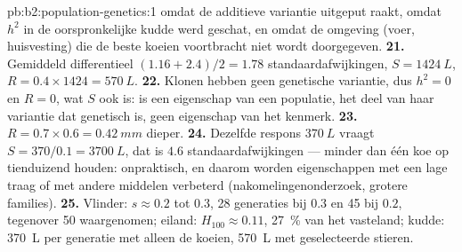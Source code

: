 \begin{solution}{pb:b2:population-genetics:1}
omdat de additieve variantie uitgeput raakt, omdat $h^{2}$
in de oorspronkelijke kudde werd geschat, en omdat de omgeving
(voer, huisvesting) die de beste koeien voortbracht niet wordt doorgegeven.
\textbf{21.} Gemiddeld differentieel $(1.16 + 2.4)/2 = 1.78$
standaardafwijkingen, $S = \qty{1424}{L}$, $R = 0.4\times 1424 = \qty{570}{L}$.
\textbf{22.} Klonen hebben geen genetische variantie, dus $h^{2} = 0$ en $R =
0$, wat $S$ ook is:  is een eigenschap van een populatie,
het deel van haar variantie dat genetisch is, geen eigenschap van het kenmerk.
\textbf{23.} $R = 0.7\times 0.6 = \qty{0.42}{mm}$ dieper.
\textbf{24.} Dezelfde respons $\qty{370}{L}$ vraagt $S = 370/0.1 =
\qty{3700}{L}$, dat is $4.6$ standaardafwijkingen --- minder dan één koe op
tienduizend houden: onpraktisch, en daarom worden eigenschappen met een lage
 traag of met andere middelen verbeterd
(nakomelingenonderzoek, grotere families).
\textbf{25.} Vlinder: $s \approx 0.2$ tot $0.3$, 28 generaties bij $0.3$
en 45 bij $0.2$, tegenover 50 waargenomen; eiland: $H_{100} \approx 0.11$,
\qty{27}{\%} van het vasteland; kudde: \qty{370}{L} per generatie met
alleen de koeien, \qty{570}{L} met geselecteerde stieren.
\end{solution}
